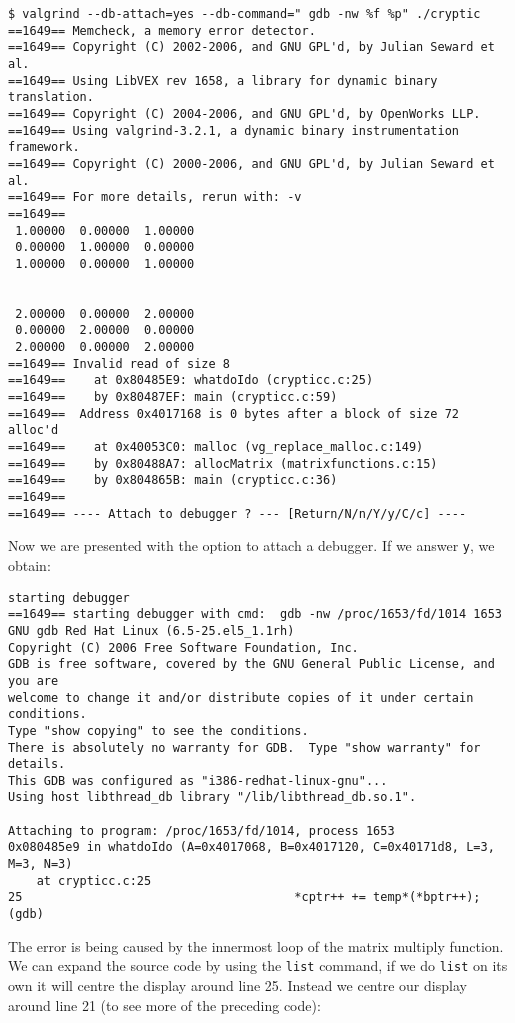 \documentclass[a4paper,12pt]{article}
\begin{document}
\begin{verbatim}
$ valgrind --db-attach=yes --db-command=" gdb -nw %f %p" ./cryptic
==1649== Memcheck, a memory error detector.
==1649== Copyright (C) 2002-2006, and GNU GPL'd, by Julian Seward et al.
==1649== Using LibVEX rev 1658, a library for dynamic binary translation.
==1649== Copyright (C) 2004-2006, and GNU GPL'd, by OpenWorks LLP.
==1649== Using valgrind-3.2.1, a dynamic binary instrumentation framework.
==1649== Copyright (C) 2000-2006, and GNU GPL'd, by Julian Seward et al.
==1649== For more details, rerun with: -v
==1649== 
 1.00000  0.00000  1.00000 
 0.00000  1.00000  0.00000 
 1.00000  0.00000  1.00000 


 2.00000  0.00000  2.00000 
 0.00000  2.00000  0.00000 
 2.00000  0.00000  2.00000 
==1649== Invalid read of size 8
==1649==    at 0x80485E9: whatdoIdo (crypticc.c:25)
==1649==    by 0x80487EF: main (crypticc.c:59)
==1649==  Address 0x4017168 is 0 bytes after a block of size 72 alloc'd
==1649==    at 0x40053C0: malloc (vg_replace_malloc.c:149)
==1649==    by 0x80488A7: allocMatrix (matrixfunctions.c:15)
==1649==    by 0x804865B: main (crypticc.c:36)
==1649== 
==1649== ---- Attach to debugger ? --- [Return/N/n/Y/y/C/c] ---- 
\end{verbatim}
Now we are presented with the option to attach a debugger. If we answer {\tt y}, we obtain:
\begin{verbatim}
starting debugger
==1649== starting debugger with cmd:  gdb -nw /proc/1653/fd/1014 1653
GNU gdb Red Hat Linux (6.5-25.el5_1.1rh)
Copyright (C) 2006 Free Software Foundation, Inc.
GDB is free software, covered by the GNU General Public License, and you are
welcome to change it and/or distribute copies of it under certain conditions.
Type "show copying" to see the conditions.
There is absolutely no warranty for GDB.  Type "show warranty" for details.
This GDB was configured as "i386-redhat-linux-gnu"...
Using host libthread_db library "/lib/libthread_db.so.1".

Attaching to program: /proc/1653/fd/1014, process 1653
0x080485e9 in whatdoIdo (A=0x4017068, B=0x4017120, C=0x40171d8, L=3, M=3, N=3)
    at crypticc.c:25
25                                      *cptr++ += temp*(*bptr++);
(gdb)
\end{verbatim}
The error is being caused by the innermost loop of the matrix multiply function. We can expand the source code by using the {\tt list} command, if we do {\tt list} on its own it will centre the display around line 25. Instead we centre our display around line 21 (to see more of the preceding code):
\end{document}
